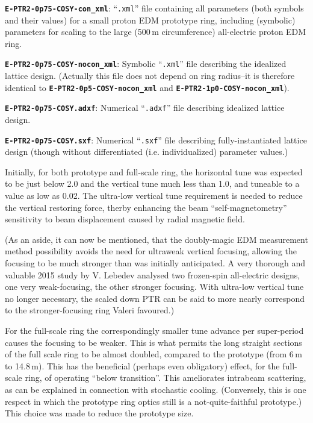 \documentclass[]{article}
\begin{document}
\begin{description}
\item{{\bf\tt E-PTR2-0p75-COSY-con\_xml}:  }
``{\tt .xml}'' file containing 
all parameters (both symbols and their values) for a small 
proton EDM prototype ring, including (symbolic) 
parameters for scaling to the large (500\,m circumference) all-electric 
proton EDM ring.
\item{{\bf\tt E-PTR2-0p75-COSY-nocon\_xml}:  }
Symbolic ``{\tt .xml}'' file describing the idealized lattice design. (Actually
this file does not depend on ring radius--it is therefore 
identical to {\bf\tt E-PTR2-0p5-COSY-nocon\_xml} and {\bf\tt E-PTR2-1p0-COSY-nocon\_xml}). 
\item{{\bf\tt E-PTR2-0p75-COSY.adxf}:  }
Numerical ``{\tt .adxf}'' file describing idealized lattice design.
\item{{\bf\tt E-PTR2-0p75-COSY.sxf}:  }
Numerical ``{\tt .sxf}'' file describing fully-instantiated lattice design
(though without differentiated (i.e. individualized) parameter values.)
\end{description}
%
Initially, for both prototype and full-scale ring, the horizontal tune
was expected to be just below 2.0 and the vertical tune much less than 1.0,
and tuneable to a value as low as 0.02. The
ultra-low vertical tune requirement is needed to reduce the
vertical restoring force, therby enhancing the beam ``self-magnetometry'' 
sensitivity to beam displacement caused by radial magnetic field. 

(As an aside, it can now be mentioned, that the doubly-magic EDM 
measurement method possibility avoids the need for ultraweak vertical 
focusing, allowing the focusing to be much stronger than was initially anticipated.
A very thorough and valuable 2015 study by V. Lebedev\cite{Lebedev} analysed 
two frozen-spin all-electric designs, one very weak-focusing, the other 
stronger focusing. With ultra-low vertical tune no longer necessary, the
scaled down PTR can be said to more nearly correspond to
the stronger-focusing ring Valeri favoured.)

For the full-scale ring the correspondingly smaller tune advance per 
super-period causes the focusing to be weaker. This is what 
permits the long straight sections of the full scale ring to be almost
doubled, compared to the prototype (from 6\,m to 14.8\,m). 
This has the beneficial (perhaps even obligatory) effect, for the full-scale ring, 
of operating ``below transition''. This ameliorates intrabeam scattering, 
as can be explained in connection with stochastic cooling. 
(Conversely, this is one respect in which the prototype ring optics still is a 
not-quite-faithful prototype.) This choice was made to reduce the prototype 
size.
\end{document}
